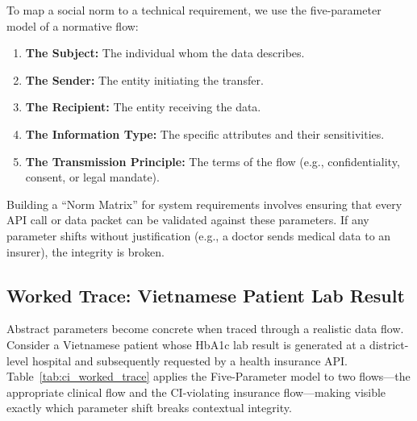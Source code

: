 To map a social norm to a technical requirement, we use the five-parameter model of a normative flow:

\begin{enumerate}
    \item \textbf{The Subject:} The individual whom the data describes.
    \item \textbf{The Sender:} The entity initiating the transfer.
    \item \textbf{The Recipient:} The entity receiving the data.
    \item \textbf{The Information Type:} The specific attributes and their sensitivities.
    \item \textbf{The Transmission Principle:} The terms of the flow (e.g., confidentiality, consent, or legal mandate).
\end{enumerate}

Building a ``Norm Matrix'' for system requirements involves ensuring that every API call or data packet can be validated against these parameters. If any parameter shifts without justification (e.g., a doctor sends medical data to an insurer), the integrity is broken.

\subsection{Worked Trace: Vietnamese Patient Lab Result}
\label{subsec:ci_worked_trace}

Abstract parameters become concrete when traced through a realistic data flow. Consider a Vietnamese patient whose HbA1c lab result is generated at a district-level hospital and subsequently requested by a health insurance API. Table~\ref{tab:ci_worked_trace} applies the Five-Parameter model to two flows---the appropriate clinical flow and the CI-violating insurance flow---making visible exactly which parameter shift breaks contextual integrity.

